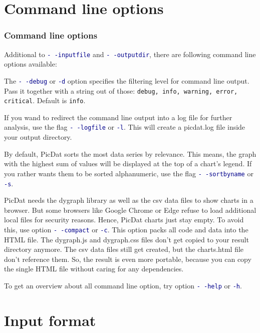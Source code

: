 \documentclass[8pt]{beamer}
\begin{document}
\section{Command line options}
\begin{frame}[label=options]
\frametitle{Command line options}
Additional to \textcolor{darkblue}{\texttt{-\,-inputfile}} and \textcolor{darkblue}{\texttt{-\,-outputdir}}, there are following command line options available:
\bigskip

The \textcolor{darkblue}{\texttt{-\,-debug}} or \textcolor{darkblue}{\texttt{-d}} option specifies the filtering level for command line output. Pass it together with a string out of those: \texttt{debug, info, warning, error, critical}. Default is \texttt{info}.
\bigskip

If you wand to redirect the command line output into a log file for further analysis, use the flag \textcolor{darkblue}{\texttt{-\,-logfile}} or \textcolor{darkblue}{\texttt{-l}}. This will create a picdat.log file inside your output directory.
\bigskip

By default, PicDat sorts the most data series by relevance. This means, the graph with the highest sum of values will be displayed at the top of a chart's legend. If you rather wants them to be sorted alphanumeric, use the flag \textcolor{darkblue}{\texttt{-\,-sortbyname}} or \textcolor{darkblue}{\texttt{-s}}.
\bigskip

PicDat needs the dygraph library as well as the csv data files to show charts in a browser. But some browsers like Google Chrome or Edge refuse to load additional local files for security reasons. Hence, PicDat charts just stay empty. To avoid this, use option \textcolor{darkblue}{\texttt{-\,-compact}} or \textcolor{darkblue}{\texttt{-c}}. This option packs all code and data into the HTML file. The dygraph.js and dygraph.css files don't get copied to your result directory anymore. The csv data files still get created, but the charts.html file don't reference them. So, the result is even more portable, because you can copy the single HTML file without caring for any dependencies.
\bigskip

To get an overview about all command line option, try option \textcolor{darkblue}{\texttt{-\,-help}} or \textcolor{darkblue}{\texttt{-h}}.
\end{frame}

\section{Input format}
\end{document}
